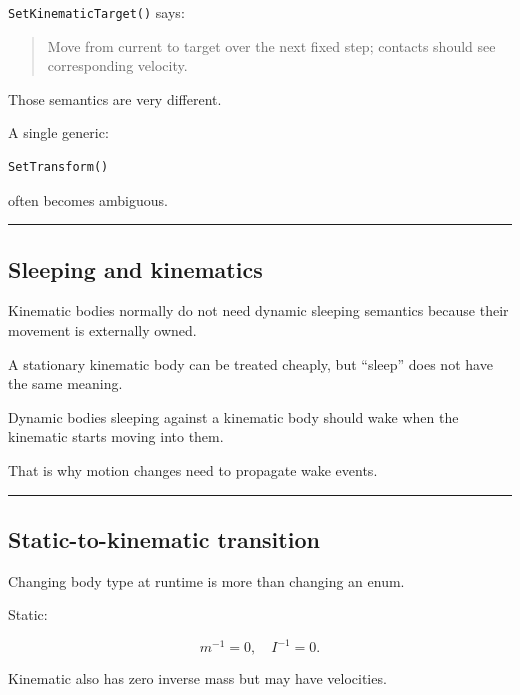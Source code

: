 \texttt{SetKinematicTarget()} says:

\begin{quote}
Move from current to target over the next fixed step; contacts should see corresponding velocity.
\end{quote}

Those semantics are very different.

A single generic:

\begin{verbatim}
SetTransform()
\end{verbatim}

often becomes ambiguous.

\begin{center}\rule{0.5\linewidth}{0.5pt}\end{center}

\subsection{Sleeping and kinematics}\label{06-engine-ii-ch038-sleeping-and-kinematics}

\hypertarget{06-engine-ii-ch038-sleeping-and-kinematics}{}

Kinematic bodies normally do not need dynamic sleeping semantics because their movement is externally owned.

A stationary kinematic body can be treated cheaply, but ``sleep'' does not have the same meaning.

Dynamic bodies sleeping against a kinematic body should wake when the kinematic starts moving into them.

That is why motion changes need to propagate wake events.

\begin{center}\rule{0.5\linewidth}{0.5pt}\end{center}

\subsection{Static-to-kinematic transition}\label{06-engine-ii-ch038-static-to-kinematic-transition}

\hypertarget{06-engine-ii-ch038-static-to-kinematic-transition}{}

Changing body type at runtime is more than changing an enum.

Static:

\[
m^{-1}=0,\quad I^{-1}=0.
\]

Kinematic also has zero inverse mass but may have velocities.

